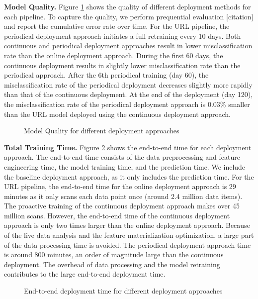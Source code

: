 \textbf{Model Quality. }
Figure \ref{deployment-quality-figure} shows the quality of different deployment methods for each pipeline. 
To capture the quality, we perform prequential evaluation [citation] and report the cumulative error rate over time.
For the URL pipeline, the periodical deployment approach initiates a full retraining every 10 days.
Both continuous and periodical deployment approaches result in lower misclassification rate than the online deployment approach.
During the first 60 days, the continuous deployment results in slightly lower misclassification rate than the periodical approach.
After the 6th periodical training (day 60), the misclassification rate of the periodical deployment decreases slightly more rapidly than that of the continuous deployment. 
At the end of the deployment (day 120), the misclassification rate of the periodical deployment approach is 0.03\% smaller than the URL model deployed using the continuous deployment approach.
\begin{figure}[h!]
\centering
\resizebox{\columnwidth}{!}{}
\caption{Model Quality for different deployment approaches}
\label{deployment-quality-figure}
\end{figure}

\textbf{Total Training Time. }
Figure \ref{deployment-time-figure} shows the end-to-end  time for each deployment approach.
The end-to-end time consists of the data preprocessing and feature engineering time, the model training time, and the prediction time. 
We include the baseline deployment approach, as it only includes the prediction time.
For the URL pipeline, the end-to-end time for the online deployment approach is 29 minutes as it only scans each data point once (around 2.4 million data items).  
The proactive training of the continuous deployment approach makes over 45 million scans.
However, the end-to-end time of the continuous deployment approach is only two times larger than the online deployment approach. 
Because of the live data analysis and the feature materialization optimization, a large part of the data processing time is avoided.
The periodical deployment approach time is around 800 minutes, an order of magnitude large than the continuous deployment. 
The overhead of data processing and the model retraining contributes to the large end-to-end deployment time.


\begin{figure}[h!]
\centering
\resizebox{\columnwidth}{!}{}
\caption{End-to-end deployment time for different deployment approaches}
\label{deployment-time-figure}
\end{figure}

